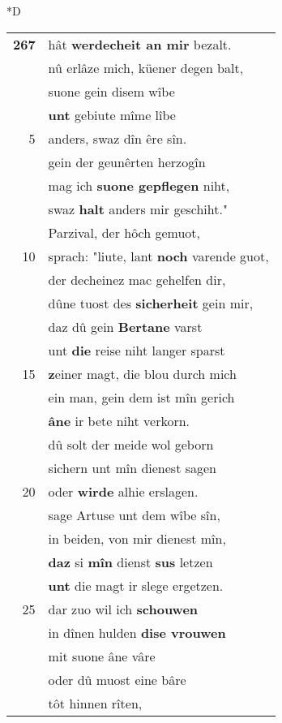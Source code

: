 \documentclass[8pt,a4paper,notitlepage]{article}
\begin{document}
\begin{table}[ht]
\begin{minipage}[t]{0.5\linewidth}
\small
\begin{center}*D
\end{center}
\begin{tabular}{rl}
\textbf{267} & hât \textbf{werdecheit an mir} bezalt.\\ 
 & nû erlâze mich, küener degen balt,\\ 
 & suone gein disem wîbe\\ 
 & \textbf{unt} gebiute mîme lîbe\\ 
5 & anders, swaz dîn êre sîn.\\ 
 & gein der geunêrten herzogîn\\ 
 & mag ich \textbf{suone gepflegen} niht,\\ 
 & swaz \textbf{halt} anders mir geschiht."\\ 
 & Parzival, der hôch gemuot,\\ 
10 & sprach: "liute, lant \textbf{noch} varende guot,\\ 
 & der decheinez mac gehelfen dir,\\ 
 & dûne tuost des \textbf{sicherheit} gein mir,\\ 
 & daz dû gein \textbf{Bertane} varst\\ 
 & unt \textbf{die} reise niht langer sparst\\ 
15 & \textbf{z}einer magt, die blou durch mich\\ 
 & ein man, gein dem ist mîn gerich\\ 
 & \textbf{âne} ir bete niht verkorn.\\ 
 & dû solt der meide wol geborn\\ 
 & sichern unt mîn dienest sagen\\ 
20 & oder \textbf{wirde} alhie erslagen.\\ 
 & sage Artuse unt dem wîbe sîn,\\ 
 & in beiden, von mir dienest mîn,\\ 
 & \textbf{daz} si \textbf{mîn} dienst \textbf{sus} letzen\\ 
 & \textbf{unt} die magt ir slege ergetzen.\\ 
25 & dar zuo wil ich \textbf{schouwen}\\ 
 & in dînen hulden \textbf{dise vrouwen}\\ 
 & mit suone âne vâre\\ 
 & oder dû muost eine bâre\\ 
 & tôt hinnen rîten,\\ 

\end{tabular}
\end{minipage}
\end{table}
\end{document}
